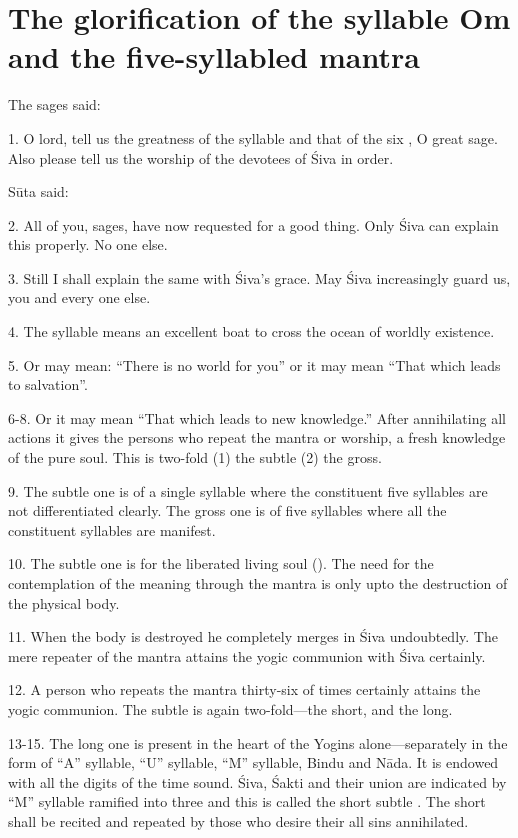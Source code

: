 \chapter{The glorification of the syllable Om and the five-syllabled mantra}

The sages said:

1. O lord, tell us the greatness of the syllable  and that of the six
, O great sage. Also please tell us the worship of the devotees of
Śiva in order.

Sūta said:

2. All of you, sages, have now requested for a good thing. Only Śiva can explain
this properly. No one else.

3. Still I shall explain the same with Śiva’s grace. May Śiva increasingly guard
us, you and every one else.

4. The syllable  means an excellent boat to cross the ocean of worldly
existence.

5. Or  may mean: “There is no world for you” or it may mean “That
which leads to salvation”.

6-8. Or it may mean “That which leads to new knowledge.” After annihilating all
actions it gives the persons who repeat the mantra or worship, a fresh knowledge
of the pure soul. This  is two-fold (1) the subtle (2) the gross.

9. The subtle one is of a single syllable where the constituent five syllables
are not differentiated clearly. The gross one is of five syllables where all
the constituent syllables are manifest.

10. The subtle one is for the liberated living soul (). The need
for the contemplation of the meaning through the mantra is only upto
the destruction of the physical body.

11. When the body is destroyed he completely merges in Śiva undoubtedly.
The mere repeater of the mantra attains the yogic communion with Śiva certainly.

12. A person who repeats the mantra thirty-six  of times certainly
attains the yogic communion. The subtle  is again two-fold—the short,
and the long.

13-15. The long one is present in the heart of the Yogins alone—separately in
the form of “A” syllable, “U” syllable, “M” syllable, Bindu and Nāda. It is
endowed with all the digits of the time sound. Śiva, Śakti and their union are
indicated by “M” syllable ramified into three and this is called the short
subtle . The short  shall be recited and repeated by
those who desire their all sins annihilated.

